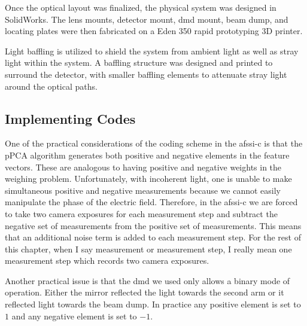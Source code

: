 
Once the optical layout was finalized, the physical system was designed in SolidWorks. The lens mounts, detector mount, \gls{dmd} mount, beam dump, and locating plates were then fabricated on a Eden 350 rapid prototyping 3D printer.

Light baffling is utilized to shield the system from ambient light as well as stray light within the system. A baffling structure was designed and printed to surround the detector, with smaller baffling elements to attenuate stray light around the optical paths.


\subsection{Implementing Codes}

One of the practical considerations of the coding scheme in the \gls{afssi-c} is that the pPCA algorithm generates both positive and negative elements in the feature vectors. These are analogous to having positive and negative weights in the weighing problem. Unfortunately, with incoherent light, one is unable to make simultaneous positive and negative measurements because we cannot easily manipulate the phase of the electric field. Therefore, in the \gls{afssi-c} we are forced to take two camera exposures for each measurement step and subtract the negative set of measurements from the positive set of measurements. This means that an additional noise term is added to each measurement step. For the rest of this chapter, when I say measurement or measurement step, I really mean one  measurement step which records two camera exposures.

Another practical issue is that the \gls{dmd} we used only allows a binary mode of operation. Either the mirror reflected the light towards the second arm or it reflected light towards the beam dump. In practice any positive element is set to $1$ and any negative element is set to $-1$. 

